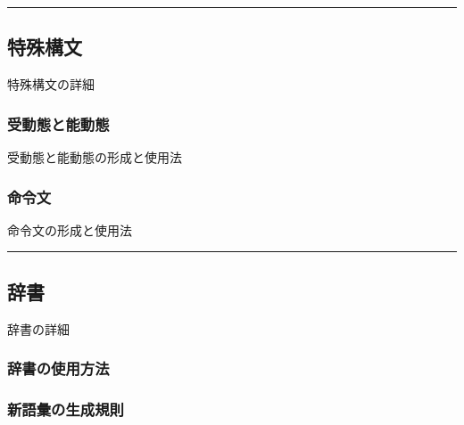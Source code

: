 \documentclass[
  japanese,
]{article}
\providecommand{\tightlist}{%
  \setlength{\itemsep}{0pt}\setlength{\parskip}{0pt}}
\begin{document}
\begin{description}
\tightlist
\item[]
\end{description}

\begin{center}\rule{0.5\linewidth}{0.5pt}\end{center}

\subsection{特殊構文}\label{chapter7}

特殊構文の詳細

\subsubsection{受動態と能動態}\label{section7.1}

受動態と能動態の形成と使用法

\begin{description}
\tightlist
\item[]
\end{description}

\subsubsection{命令文}\label{section7.2}

命令文の形成と使用法

\begin{description}
\tightlist
\item[]
\end{description}

\begin{center}\rule{0.5\linewidth}{0.5pt}\end{center}

\subsection{辞書}\label{chapter8}

辞書の詳細

\subsubsection{辞書の使用方法}\label{section8.1}

\subsubsection{新語彙の生成規則}\label{section8.2}
\end{document}
